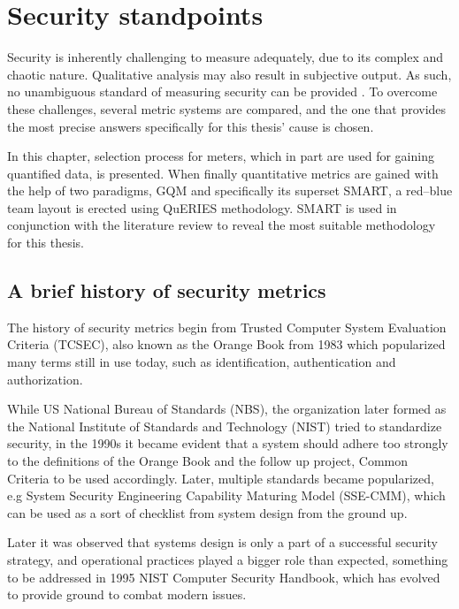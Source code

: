 \chapter{Security standpoints} \label{securitystandpoints}

Security is inherently challenging to measure adequately, due to its complex and chaotic nature. Qualitative analysis may also result in subjective output. As such, no unambiguous standard of measuring security can be provided \cite{wang2005information}. To overcome these challenges, several metric systems are compared, and the one that provides the most precise answers specifically for this thesis' cause is chosen.

In this chapter, selection process for meters, which in part are used for gaining quantified data, is presented.  When finally quantitative metrics are gained with the help of two paradigms, GQM and specifically its superset SMART, a red–blue team layout is erected using QuERIES methodology. SMART is used in conjunction with the literature review to reveal the most suitable methodology for this thesis.

\section{A brief history of security metrics}

The history of security metrics begin from Trusted Computer System Evaluation Criteria (TCSEC), also known as the Orange Book from 1983 which popularized many terms still in use today, such as identification, authentication and authorization. \cite{bayuk2013measuring} 

While US National Bureau of Standards (NBS), the organization later formed as the National Institute of Standards and Technology (NIST) tried to standardize security, in the 1990s it became evident that a system should adhere too strongly to the definitions of the Orange Book and the follow up project, Common Criteria to be used accordingly. Later, multiple standards became popularized, e.g System Security Engineering Capability Maturing Model (SSE-CMM), which can be used as a sort of checklist from system design from the ground up. \cite{bayuk2013measuring} 

Later it was observed that systems design is only a part of a successful security strategy, and operational practices played a bigger role than expected, something to be addressed in 1995 NIST Computer Security Handbook, which has evolved to provide ground to combat modern issues. \cite{bayuk2013measuring} 


